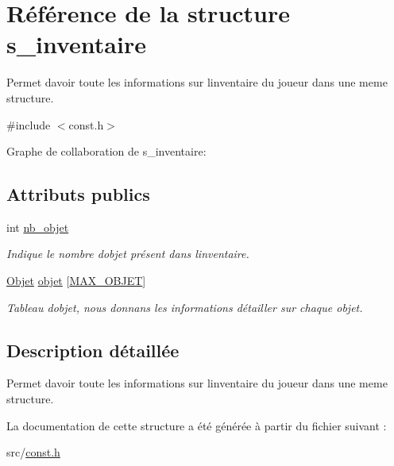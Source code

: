 \hypertarget{structs__inventaire}{}\section{Référence de la structure s\+\_\+inventaire}
\label{structs__inventaire}


Permet d\textquotesingle{}avoir toute les informations sur l\textquotesingle{}inventaire du joueur dans une meme structure.  




{\ttfamily \#include $<$const.\+h$>$}



Graphe de collaboration de s\+\_\+inventaire\+:
\subsection*{Attributs publics}
\begin{DoxyCompactItemize}
\item 
\mbox{\label{structs__inventaire_ad60a400ecaf94afc9c0cb2cbf0a7005e}} 
int \hyperlink{structs__inventaire_ad60a400ecaf94afc9c0cb2cbf0a7005e}{nb\+\_\+objet}
\begin{DoxyCompactList}\small\item\em Indique le nombre d\textquotesingle{}objet présent dans l\textquotesingle{}inventaire. \end{DoxyCompactList}\item 
\mbox{\label{structs__inventaire_a157cc3b6cb6ef479dde0b6c006eef299}} 
\hyperlink{const_8h_abba99f972374fba2fe4484538ae17a05}{Objet} \hyperlink{structs__inventaire_a157cc3b6cb6ef479dde0b6c006eef299}{objet} \mbox{[}\hyperlink{const_8h_ac073582df7b933b8ce9c9e414e821a5c}{M\+A\+X\+\_\+\+O\+B\+J\+ET}\mbox{]}
\begin{DoxyCompactList}\small\item\em Tableau d\textquotesingle{}objet, nous donnans les informations détailler sur chaque objet. \end{DoxyCompactList}\end{DoxyCompactItemize}


\subsection{Description détaillée}
Permet d\textquotesingle{}avoir toute les informations sur l\textquotesingle{}inventaire du joueur dans une meme structure. 

La documentation de cette structure a été générée à partir du fichier suivant \+:\begin{DoxyCompactItemize}
\item 
src/\hyperlink{const_8h}{const.\+h}\end{DoxyCompactItemize}
